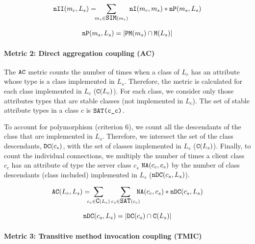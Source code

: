 \begin{equation*}
   \verb|nII|(m_c, L_s) =\!\!\! \sum_{m_s \in \verb|SIM|(m_c)} \verb|nI|(m_c, m_s)*\verb|nP|(m_s, L_s)
\end{equation*}

\begin{equation*}
    \verb|nP|(m_s, L_s) = |\verb|PM|(m_s) \cap \verb|M|(L_s)|
\end{equation*}

\paragraph{Metric 2: Direct aggregation coupling (AC)}
The $\verb|AC|$ metric counts the number of times when a class of $L_c$ has an attribute whose type is a class implemented in $L_s$. Therefore, the metric is calculated for each class implemented in $L_c$ ($\verb|C|(L_c)$). For each class, we consider only those attributes types that are stable classes (not implemented in $L_c$). The set of stable attribute types in a class $c$ %
is $\verb|SAT(c_c)|$.

To account for polymorphism (criterion 6), we count all the descendants of the class that are implemented in $L_s$. Therefore, we intersect the set %
of the class descendants, $\verb|DC|(c_s)$, with the set of
classes implemented in $L_s$ ($\verb|C|(L_s)$). Finally, to count the  individual connections, we multiply the number of times a client class $c_c$ has an attribute of type the server class $c_s$ $\verb|NA|(c_c, c_s)$ by the number of class descendants (class included) implemented in $L_s$ ($\verb|nDC|(c_s,L_s)$).

\begin{equation*}
  \verb|AC|(L_c,L_s) = \!\!\!\!\sum_{c_c \in \verb|C|(L_c)} \sum_{c_s \in \verb|SAT|(c_c)} \!\!\!\!\verb|NA|(c_c, c_s)*\verb|nDC|(c_s, L_s)
\end{equation*}

\begin{equation*}
    \verb|nDC|(c_s, L_s) = |\verb|DC|(c_s) \cap \verb|C|(L_s)|
\end{equation*}

\paragraph{Metric 3: Transitive method invocation coupling (TMIC)}

